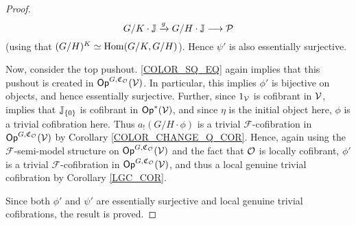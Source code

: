 \documentclass[a4paper,10pt
,draft
]{article}%
\renewcommand{\F}{\mathcal F}
\newcommand{\J}{\mathbb J}
\renewcommand{\1}{\eta}%
\begin{document}
\begin{proof}
\begin{equation}
            G/K \cdot \J \xrightarrow{g} G/H \cdot \J \longto \P
      \end{equation}
      (using that $(G/H)^K \simeq \operatorname{Hom}(G/K, G/H)$).
      Hence $\psi'$ is also essentially surjective.

      Now, consider the top pushout. \eqref{COLOR_SQ_EQ} again implies that this pushout is created in $\mathsf{Op}^{G, \mathfrak C_{\mathcal{O}}}(\mathcal V)$.
      In particular, this implies $\phi'$ is bijective on objects, and hence essentially surjective.
      Further, since $1_{\mathcal V}$ is cofibrant in $\mathcal V$, \cite[Thm. 1.15]{BM13} implies that $\J_{\set 0}$ is cofibrant in $\Op^{\**}(\V)$,
      and since $\1$ is the initial object here, $\phi$ is a trivial cofibration here.
      Thus $a_! (G/H \cdot \phi)$ is a trivial $\F$-cofibration in $\mathsf{Op}^{G, \mathfrak C_{\mathcal{O}}}(\mathcal V)$ by Corollary \ref{COLOR_CHANGE_Q_COR}.
      Hence, again using the $\F$-semi-model structure on $\mathsf{Op}^{G, \mathfrak C_{\mathcal{O}}}(\mathcal V)$ and the fact that $\mathcal{O}$ is locally cofibrant,
      $\phi'$ is a trivial $\F$-cofibration in $\mathsf{Op}^{G,\mathfrak C_{\mathcal{O}}}(\mathcal V)$,
      and thus a local genuine trivial cofibration by Corollary \ref{LGC_COR}.
      
      Since both $\phi'$ and $\psi'$ are essentially surjective and local genuine trivial cofibrations,
      the result is proved.
\end{proof}
\end{document}
